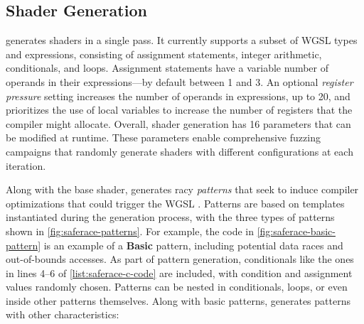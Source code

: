 \subsection{Shader Generation \label{sec:saferace-base-gen}}

\wgslmemsmith generates shaders in a single pass. It currently supports a subset of WGSL types and expressions, consisting of assignment statements, integer arithmetic, conditionals, and loops. Assignment statements have a variable number of operands in their expressions---by default between 1 and 3. An optional \textit{register pressure} setting increases the number of operands in expressions, up to 20, and prioritizes the use of local variables to increase the number of registers that the compiler might allocate. Overall, shader generation has 16 parameters that can be modified at runtime. These parameters enable comprehensive fuzzing campaigns that randomly generate shaders with different configurations at each iteration.

Along with the base shader, \wgslmemsmith generates racy \textit{patterns} that seek to induce compiler optimizations that could trigger the WGSL \drsv. Patterns are based on templates instantiated during the generation process, with the three types of patterns shown in \myfig\ref{fig:saferace-patterns}. For example, the code in \myfig\ref{fig:saferace-basic-pattern} is an example of a \textbf{Basic} pattern, including potential data races and out-of-bounds accesses. As part of pattern generation, conditionals like the ones in lines 4--6 of \mylisting\ref{list:saferace-c-code} are included, with condition and assignment values randomly chosen. Patterns can be nested in conditionals, loops, or even inside other patterns themselves. Along with basic patterns, \wgslmemsmith generates patterns with other characteristics:

